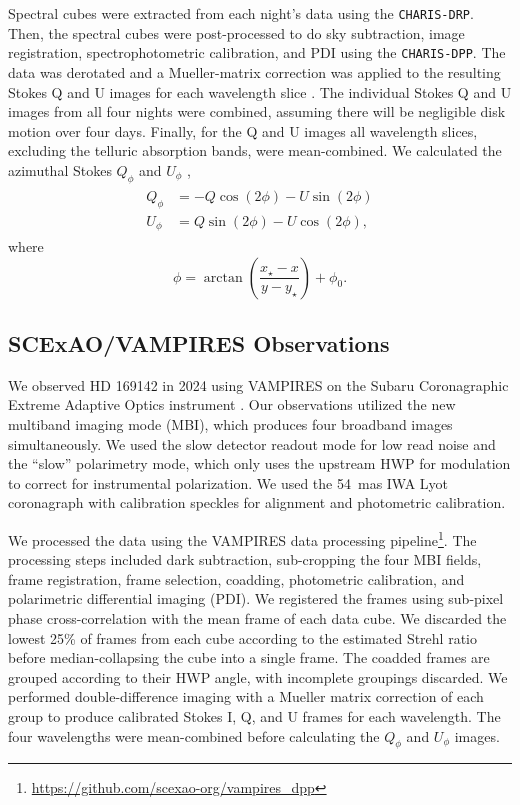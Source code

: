 Spectral cubes were extracted from each night's data using the \texttt{CHARIS-DRP}. Then, the spectral cubes were post-processed to do sky subtraction, image registration, spectrophotometric calibration, and PDI using the \texttt{CHARIS-DPP}. The data was derotated and a Mueller-matrix correction was applied to the resulting Stokes Q and U images for each wavelength slice \citep{joost_t_hart_full_2021}. The individual Stokes Q and U images from all four nights were combined, assuming there will be negligible disk motion over four days. Finally, for the Q and U images all wavelength slices, excluding the telluric absorption bands, were mean-combined. We calculated the azimuthal Stokes $Q_\phi$ and $U_\phi$ \citep{schmid_limb_2006,monnier_multiple_2019},
\begin{align}
\begin{split}
    \label{eqn:az_stokes}
    Q_\phi &= -Q\cos{\left(2\phi\right)} - U\sin{\left(2\phi\right)} \\
    U_\phi &= Q\sin{\left(2\phi\right)} - U\cos{\left(2\phi\right)},
\end{split}
\end{align}
where
\begin{equation}
    \phi = \arctan{\left( \frac{x_\star - x}{y - y_\star} \right)} + \phi_0.
\end{equation}

\subsection{SCExAO/VAMPIRES Observations\label{sec:obs_vampires}}

We observed HD 169142 in 2024 using VAMPIRES \citep{norris_vampires_2015,lucas_visible-light_2024-1} on the Subaru Coronagraphic Extreme Adaptive Optics instrument \citep{jovanovic_subaru_2015}. Our observations utilized the new multiband imaging mode (MBI), which produces four broadband images simultaneously. We used the slow detector readout mode for low read noise and the ``slow'' polarimetry mode, which only uses the upstream HWP for modulation to correct for instrumental polarization. We used the \SI{54}{mas} IWA Lyot coronagraph with calibration speckles for alignment and photometric calibration.

We processed the data using the VAMPIRES data processing pipeline\footnote{\url{https://github.com/scexao-org/vampires_dpp}}. The processing steps included dark subtraction, sub-cropping the four MBI fields, frame registration, frame selection, coadding, photometric calibration, and polarimetric differential imaging (PDI). We registered the frames using sub-pixel phase cross-correlation \citep{guizar-sicairos_efficient_2008} with the mean frame of each data cube. We discarded the lowest 25\% of frames from each cube according to the estimated Strehl ratio before median-collapsing the cube into a single frame. The coadded frames are grouped according to their HWP angle, with incomplete groupings discarded. We performed double-difference imaging with a Mueller matrix correction of each group to produce calibrated Stokes I, Q, and U frames for each wavelength. The four wavelengths were mean-combined before calculating the $Q_\phi$ and $U_\phi$ images.

